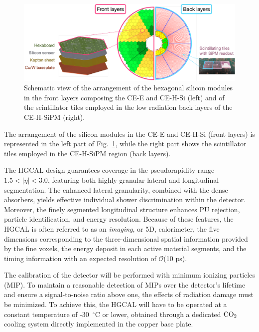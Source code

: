 \begin{figure}
    \centering
    \includegraphics[width=0.9\linewidth]{Figures/HGCAL/FrontBackLayers.pdf}
    \caption{Schematic view of the arrangement of the hexagonal silicon modules in the front layers composing the CE-E and CE-H-Si (left) and of the scintillator tiles employed in the low radiation back layers of the CE-H-SiPM (right).}
    \label{fig:FrontBackLayers}
\end{figure}

The arrangement of the silicon modules in the CE-E and CE-H-Si (front layers) is represented in the left part of Fig.~\ref{fig:FrontBackLayers}, while the right part shows the scintillator tiles employed in the CE-H-SiPM region (back layers).

\bigbreak

The HGCAL design guarantees coverage in the pseudorapidity range $1.5 < |\eta| < 3.0$, featuring both highly granular lateral and longitudinal segmentation. 
The enhanced lateral granularity, combined with the dense absorbers, yields effective individual shower discrimination within the detector. Moreover, the finely segmented longitudinal structure enhances PU rejection, particle identification, and energy resolution. Because of these features, the HGCAL is often referred to as an \textit{imaging}, or 5D, calorimeter, the five dimensions corresponding to the three-dimensional spatial information provided by the fine voxels, the energy deposit in each active material segments, and the timing information with an expected resolution of $\mathcal{O}$(10 ps).

The calibration of the detector will be performed with minimum ionizing particles (MIP). To maintain a reasonable detection of MIPs over the detector's lifetime and ensure a signal-to-noise ratio above one, the effects of radiation damage must be minimized. To achieve this, the HGCAL will have to be operated at a constant temperature of -30~$^{\circ}$C or lower, obtained through a dedicated $\textnormal{CO}_2$ cooling system directly implemented in the copper base plate. 


